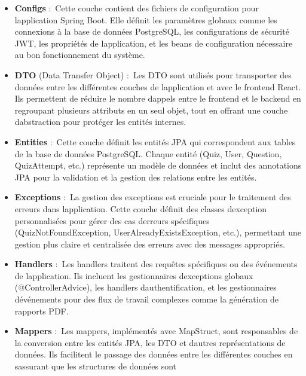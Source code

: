\documentclass[12pt,a4paper,twoside,openright]{report}
\begin{document}
\begin{itemize}
\item
  \textbf{Configs} :~Cette couche contient des fichiers de configuration
  pour l\textquotesingle application Spring Boot. Elle définit les
  paramètres globaux comme les connexions à la base de données
  PostgreSQL, les configurations de sécurité JWT, les propriétés de
  l\textquotesingle application, et les beans de configuration
  nécessaire au bon fonctionnement du système.
\item
  \textbf{DTO} (Data Transfer Object) :~Les DTO sont utilisés pour
  transporter des données entre les différentes couches de
  l\textquotesingle application et avec le frontend React. Ils
  permettent de réduire le nombre d\textquotesingle appels entre le
  frontend et le backend en regroupant plusieurs attributs en un seul
  objet, tout en offrant une couche d\textquotesingle abstraction pour
  protéger les entités internes.
\item
  \textbf{Entities} :~Cette couche définit les entités JPA qui
  correspondent aux tables de la base de données PostgreSQL. Chaque
  entité (Quiz, User, Question, QuizAttempt, etc.) représente un modèle
  de données et inclut des annotations JPA pour la validation et la
  gestion des relations entre les entités.
\item
  \textbf{Exceptions} :~La gestion des exceptions est cruciale pour le
  traitement des erreurs dans l\textquotesingle application. Cette
  couche définit des classes d\textquotesingle exception personnalisées
  pour gérer des cas d\textquotesingle erreurs spécifiques
  (QuizNotFoundException, UserAlreadyExistsException, etc.), permettant
  une gestion plus claire et centralisée des erreurs avec des messages
  appropriés.
\item
  \textbf{Handlers} :~Les handlers traitent des requêtes spécifiques ou
  des événements de l\textquotesingle application. Ils incluent les
  gestionnaires d\textquotesingle exceptions globaux
  (@ControllerAdvice), les handlers d\textquotesingle authentification,
  et les gestionnaires d\textquotesingle événements pour des flux de
  travail complexes comme la génération de rapports PDF.
\item
  \textbf{Mappers} :~Les mappers, implémentés avec MapStruct, sont
  responsables de la conversion entre les entités JPA, les DTO et
  d\textquotesingle autres représentations de données. Ils facilitent le
  passage des données entre les différentes couches en
  s\textquotesingle assurant que les structures de données sont

\end{itemize}
\end{document}
